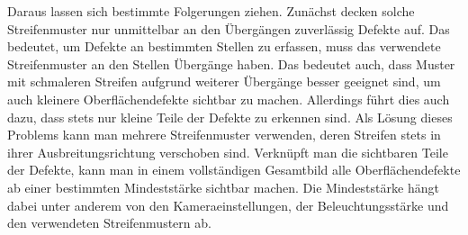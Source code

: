 \noindent
Daraus lassen sich bestimmte Folgerungen ziehen.
Zunächst decken solche Streifenmuster nur unmittelbar an den Übergängen zuverlässig Defekte auf.
Das bedeutet, um Defekte an bestimmten Stellen zu erfassen, muss das verwendete Streifenmuster an den Stellen Übergänge haben.
Das bedeutet auch, dass Muster mit schmaleren Streifen aufgrund weiterer Übergänge besser geeignet sind, um auch kleinere Oberflächendefekte sichtbar zu machen.
Allerdings führt dies auch dazu, dass stets nur kleine Teile der Defekte zu erkennen sind.
Als Lösung dieses Problems kann man mehrere Streifenmuster verwenden, deren Streifen stets in ihrer Ausbreitungsrichtung verschoben sind.
Verknüpft man die sichtbaren Teile der Defekte, kann man in einem vollständigen Gesamtbild alle Oberflächendefekte ab einer bestimmten Mindeststärke sichtbar machen.
Die Mindeststärke hängt dabei unter anderem von den Kameraeinstellungen, der Beleuchtungsstärke und den verwendeten Streifenmustern ab.